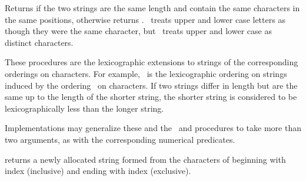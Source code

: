 \begin{entry}{%
}

Returns \schtrue{} if the two strings are the same length and contain the same
characters in the same positions, otherwise returns \schfalse.
\ treats
upper and lower case letters as though they were the same character, but
\ treats upper and lower case as distinct characters.

\end{entry}


\begin{entry}{%
}

These procedures are the lexicographic extensions to strings of the
corresponding orderings on characters.  For example, \ is
the lexicographic ordering on strings induced by the ordering
\ on characters.  If two strings differ in length but
are the same up to the length of the shorter string, the shorter string
is considered to be lexicographically less than the longer string.

Implementations may generalize these and the \ and
 procedures to take more than two arguments, as with
the corresponding numerical predicates.

\end{entry}


\begin{entry}{%
}

 returns a newly allocated string formed from the characters of
 beginning with index  (inclusive) and ending with index
 (exclusive).
\end{entry}


